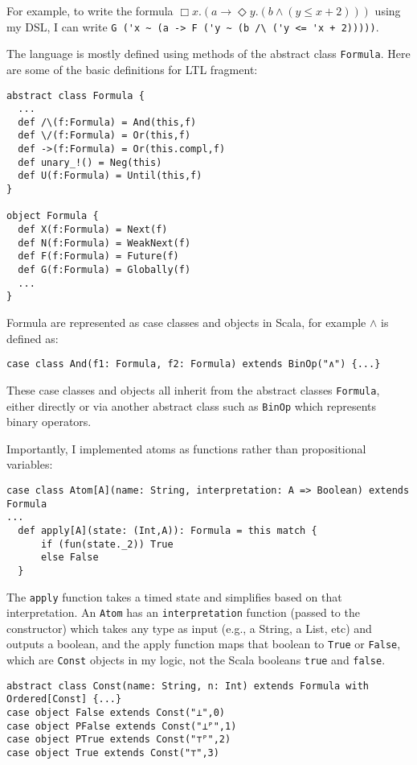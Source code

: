 \documentclass[a4paper]{article}
\begin{document}
For example, to write the formula $\Box x. (a \to \Diamond y. (b \land (y \leq x + 2)))$ using my DSL, I can write \lstinline{G ('x ~ (a -> F ('y ~ (b /\ ('y <= 'x + 2)))))}.

The language is mostly defined using methods of the abstract class \lstinline{Formula}. Here are some of the basic definitions for LTL fragment:
\begin{lstlisting}[label=lstbasic]
abstract class Formula {
  ...
  def /\(f:Formula) = And(this,f)
  def \/(f:Formula) = Or(this,f)
  def ->(f:Formula) = Or(this.compl,f)
  def unary_!() = Neg(this)
  def U(f:Formula) = Until(this,f)
}

object Formula {
  def X(f:Formula) = Next(f)
  def N(f:Formula) = WeakNext(f)
  def F(f:Formula) = Future(f)
  def G(f:Formula) = Globally(f)
  ...
}
\end{lstlisting}
Formula are represented as case classes and objects in Scala, for example $\land$ is defined as:
\begin{lstlisting}
case class And(f1: Formula, f2: Formula) extends BinOp("∧") {...}
\end{lstlisting}
These case classes and objects all inherit from the abstract classes \lstinline{Formula}, either directly or via another abstract class such as \lstinline{BinOp} which represents binary operators.

Importantly, I implemented atoms as functions rather than propositional variables:
\begin{lstlisting}
case class Atom[A](name: String, interpretation: A => Boolean) extends Formula
...
  def apply[A](state: (Int,A)): Formula = this match {
      if (fun(state._2)) True
      else False
  }
\end{lstlisting}

The \texttt{apply} function takes a timed state and simplifies based on that interpretation. An \texttt{Atom} has an \texttt{interpretation} function (passed to the constructor) which takes any type as input (e.g., a String, a List, etc) and outputs a boolean, and the apply function maps that boolean to \texttt{True} or \texttt{False}, which are \texttt{Const} objects in my logic, not the Scala booleans \texttt{true} and \texttt{false}.
\begin{lstlisting}
abstract class Const(name: String, n: Int) extends Formula with Ordered[Const] {...}
case object False extends Const("⊥",0)
case object PFalse extends Const("⊥ᴾ",1)
case object PTrue extends Const("⊤ᴾ",2)
case object True extends Const("⊤",3)
\end{lstlisting}
\end{document}
